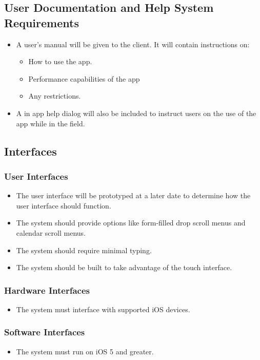 \subsection{User Documentation and Help System Requirements}
\begin{itemize}
\item A user's manual will be given to the client. It will contain instructions on:
\begin{itemize}
	\item How to use the app.
	\item Performance capabilities of the app
	\item Any restrictions.
\end{itemize}
\item A in app help dialog will also be included to instruct users on the use of the app while in the field.
\end{itemize}
\subsection{Interfaces}
\subsubsection{User Interfaces}
\begin{itemize}
\item The user interface will be prototyped at a later date to determine how the user interface should function.
\item The system should provide options like form-filled drop scroll menus and calendar scroll menus.
\item The system should require minimal typing.
\item The system should be built to take advantage of the touch interface.
\end{itemize}
\subsubsection{Hardware Interfaces}
\begin{itemize}
\item The system must interface with supported iOS devices.
\end{itemize}
\subsubsection{Software Interfaces}
\begin{itemize}
\item The system must run on iOS 5 and greater.
\end{itemize}
